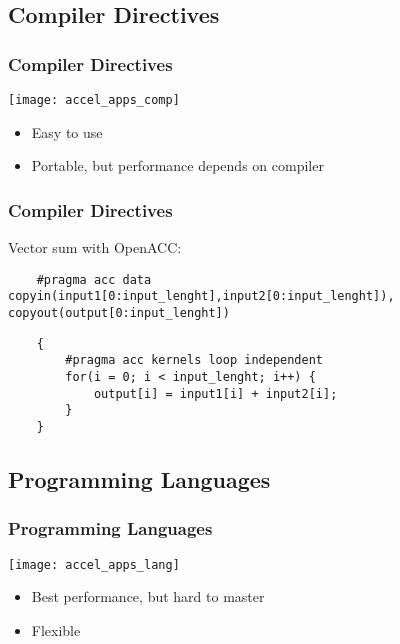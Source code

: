 \documentclass[10pt, compress]{beamer}
\begin{document}
\subsection{Compiler Directives}

\begin{frame}
    \frametitle{Compiler Directives}
    \begin{center}
        \texttt{[image: accel\_apps\_comp]}
    \end{center}
    \pause

    \begin{itemize}
        \item Easy to use
            \pause
        \item Portable, but performance depends on compiler
    \end{itemize}
\end{frame}

\begin{frame}[fragile]
    \frametitle{Compiler Directives}
    Vector sum with \alert{OpenACC}:
    \begin{lstlisting}
    #pragma acc data copyin(input1[0:input_lenght],input2[0:input_lenght]), copyout(output[0:input_lenght])
    \end{lstlisting}
    \pause
    \begin{lstlisting}
    {
        #pragma acc kernels loop independent
        for(i = 0; i < input_lenght; i++) {
            output[i] = input1[i] + input2[i];
        }
    }
    \end{lstlisting}
\end{frame}

\subsection{Programming Languages}

\begin{frame}
    \frametitle{Programming Languages}
    \begin{center}
        \texttt{[image: accel\_apps\_lang]}
    \end{center}
    \pause

    \begin{itemize}
        \item Best performance, but hard to master
            \pause
        \item Flexible
    \end{itemize}
\end{frame}
\end{document}

